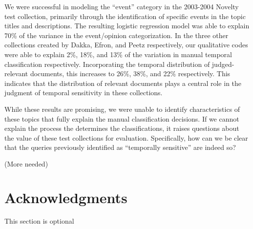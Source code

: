 \documentclass[runningheads,a4paper]{llncs}
\begin{document}
We were successful in modeling the ``event'' category in the 2003-2004 Novelty test collection, primarily through the identification of specific events in the topic titles and descriptions. The resulting logistic regression model was able to explain 70\% of the variance in the event/opinion categorization.  In the three other collections created by Dakka, Efron, and Peetz respectively, our qualitative codes were able to explain 2\%, 18\%, and 13\% of the variation in manual temporal classification respectively.  Incorporating the temporal distribution of judged-relevant documents, this increases to 26\%, 38\%, and 22\% respectively. This indicates that the distribution of relevant documents plays a central role in the judgment of temporal sensitivity in these collections.

While these results are promising, we were unable to identify characteristics of these topics that fully explain the manual classification decisions. If we cannot explain the process the determines the classifications, it raises questions about the value of these test collections for evaluation. Specifically, how can we be clear that the queries previously identified as ``temporally sensitive'' are indeed so? 

(More needed)

\section{Acknowledgments}
This section is optional

%



  
\end{document}
